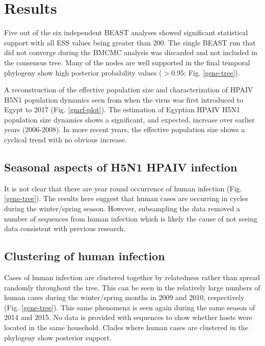 \documentclass[10pt,english]{article}
\begin{document}
\section*{Results}

Five out of the six independent BEAST analyses showed significant statistical support with all ESS values being greater than 200. The single BEAST run that did not converge during the BMCMC analysis was discarded and not included in the consensus tree. Many of the nodes are well supported in the final temporal phylogeny show high posterior probability values ($>$0.95; Fig. \ref{gene-tree}).

A reconstruction of the effective population size and characterization of HPAIV H5N1 population dynamics seen from when the virus was first introduced to Egypt to 2017 (Fig. \ref{gmrf-plot}). The estimation of Egyptian HPAIV H5N1 population size dynamics shows a significant, and expected, increase over earlier years (2006-2008). In more recent years, the effective population size shows a cyclical trend with no obvious increase.

\subsection*{Seasonal aspects of H5N1 HPAIV infection}

It is not clear that there are year round occurrence of human infection (Fig. \ref{gene-tree}). The results here suggest that human cases are occurring in cycles during the winter/spring season. However, subsampling the data removed a number of sequences from human infection which is likely the cause of not seeing data consistent with previous research. 

\subsection*{Clustering of human infection}

Cases of human infection are clustered together by relatedness rather than spread randomly throughout the tree. This can be seen in the relatively large numbers of human cases during the winter/spring months in 2009 and 2010, respectively (Fig. \ref{gene-tree}). This same phenomena is seen again during the same season of 2014 and 2015. No data is provided with sequences to show whether hosts were located in the same household. Clades where human cases are clustered in the phylogeny show posterior support. 
\end{document}
